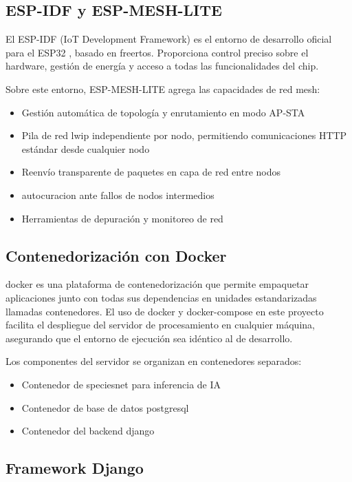 \documentclass[a4paper, 12pt]{report}
\begin{document}
\subsection{ESP-IDF y ESP-MESH-LITE}

El \gls{ESP-IDF} (IoT Development Framework) es el entorno de desarrollo
oficial para el ESP32 \cite{espmesh2023}, basado en \gls{freertos}. Proporciona
control preciso sobre el hardware, gestión de energía y acceso a todas las
funcionalidades del chip.

Sobre este entorno, \gls{ESP-MESH-LITE} agrega las capacidades de red mesh:

\begin{itemize}
  \item Gestión automática de topología y enrutamiento en modo \gls{AP-STA}
  \item Pila de red \gls{lwip} independiente por nodo, permitiendo
    comunicaciones HTTP estándar desde cualquier nodo
  \item Reenvío transparente de paquetes en capa de red entre nodos
  \item \Gls{autocuracion} ante fallos de nodos intermedios
  \item Herramientas de depuración y monitoreo de red
\end{itemize}

\subsection{Contenedorización con Docker}

\gls{docker} es una plataforma de contenedorización que permite empaquetar
aplicaciones junto con todas sus dependencias en unidades estandarizadas
llamadas contenedores. El uso de \gls{docker} y \gls{docker-compose} en este
proyecto facilita el despliegue del servidor de procesamiento en cualquier
máquina, asegurando que el entorno de ejecución sea idéntico al de desarrollo.

Los componentes del servidor se organizan en contenedores separados:
\begin{itemize}
  \item Contenedor de \gls{speciesnet} para inferencia de IA
  \item Contenedor de base de datos \gls{postgresql}
  \item Contenedor del backend \gls{django}
\end{itemize}

\subsection{Framework Django}
\end{document}
